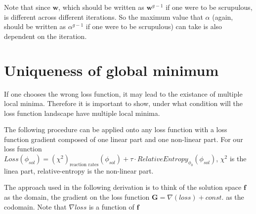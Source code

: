 \documentclass[a4paper, 12pt]{article}
\newcommand{\ve}[1]{\boldsymbol{#1}}
\begin{document}
\begin{appendices}
Note that since $\ve{w}$, which should be written as $\ve{w}^{g-1}$ if one were to be scrupulous, is different across different iterations. So the maximum value that $\alpha$ (again, should be written as $\alpha^{g-1}$ if one were to be scrupulous) can take is also dependent on the iteration.

\section{Uniqueness of global minimum}\label{Global minimum}
If one chooses the wrong loss function, it may lead to the existance of multiple local minima. Therefore it is important to show, under what condition will the loss function landscape have multiple local minima.

The following procedure can be applied onto any loss function with a loss function gradient composed of one linear part and one non-linear part. For our loss function $Loss(\phi_{sol}) = (\chi^2)_{\text{reaction rates}}(\phi_{sol}) + \tau \cdot RelativeEntropy_{\phi_0} (\phi_{sol})$, $\chi^2$ is the linea part, relative-entropy is the non-linear part.

The approach used in the following derivation is to think of the solution space $\ve{f}$ as the domain, the gradient on the loss function $\ve{G}=\nabla(loss)+ const.$ as the codomain. Note that $\nabla{loss}$ is a function of $\ve{f}$


\end{appendices}
\end{document}
